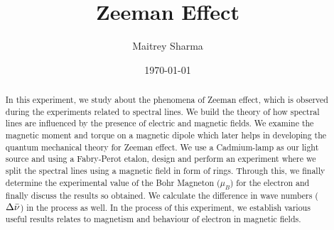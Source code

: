 \documentclass[%
 reprint,
nofootinbib,
 amsmath,amssymb,
 aps,
floatfix,
]{revtex4-2}
\begin{document}

\title{Zeeman Effect}%


\author{Maitrey Sharma}




\date{\today}%

\begin{abstract}
    In this experiment, we study about the phenomena of Zeeman effect, which is observed during the experiments related to spectral lines. We build the theory of how spectral lines are influenced by the presence of electric and magnetic fields. We examine the magnetic moment and torque on a magnetic dipole which later helps in developing the quantum mechanical theory for Zeeman effect. We use a Cadmium-lamp as our light source and using a Fabry-Perot etalon, design and perform an experiment where we split the spectral lines using a magnetic field in form of rings. Through this, we finally determine the experimental value of the Bohr Magneton ($\mu_B$) for the electron and finally discuss the results so obtained. We calculate the difference in wave numbers ($\Delta \Bar{\nu}$) in the process as well. In the process of this experiment, we establish various useful results relates to magnetism and behaviour of electron in magnetic fields.
\end{abstract}

\maketitle

\end{document}
